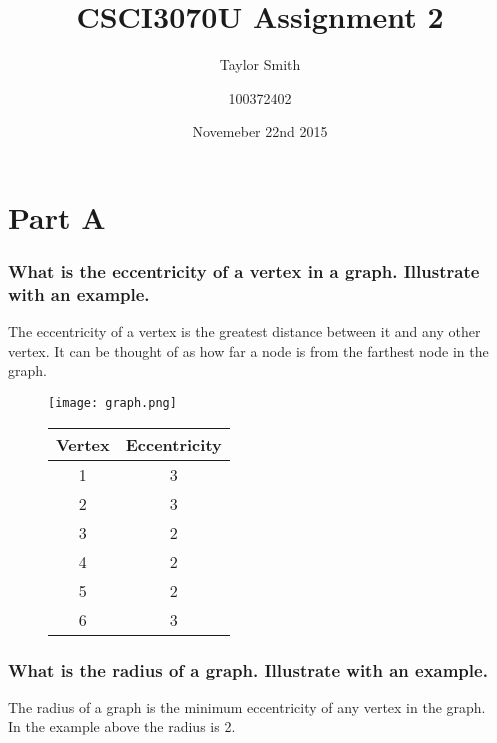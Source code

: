 \documentclass[]{article}
\begin{document}
\title{CSCI3070U Assignment 2}
\date{Novemeber 22nd 2015}
\author{Taylor Smith \and 100372402}
\maketitle
\part*{Part A}

  \section{What is the eccentricity of a vertex in a graph. Illustrate with an example.}

    The eccentricity of a vertex is the greatest distance between it and any other vertex. It can be thought of as how far a node is from the farthest node in the graph.

    \begin{figure}[ht]
      \begin{minipage}[c]{0.45\linewidth}
      \centering
      \texttt{[image: graph.png]}
      \end{minipage}
      \hspace{0.5cm}
      \begin{minipage}[b]{0.45\linewidth}
      \centering
          \begin{tabular}{| c | c |}
            \hline
            Vertex & Eccentricity \\
            \hline
            1 & 3 \\
            \hline
            2 & 3 \\
            \hline
            3 & 2 \\
            \hline
            4 & 2 \\
            \hline
            5 & 2 \\
            \hline
            6 & 3 \\
            \hline
          \end{tabular}
      \end{minipage}
    \end{figure}

  \section{What is the radius of a graph. Illustrate with an example.}

    The radius of a graph is the minimum eccentricity of any vertex in the graph.\\
    In the example above the radius is 2.
\end{document}
